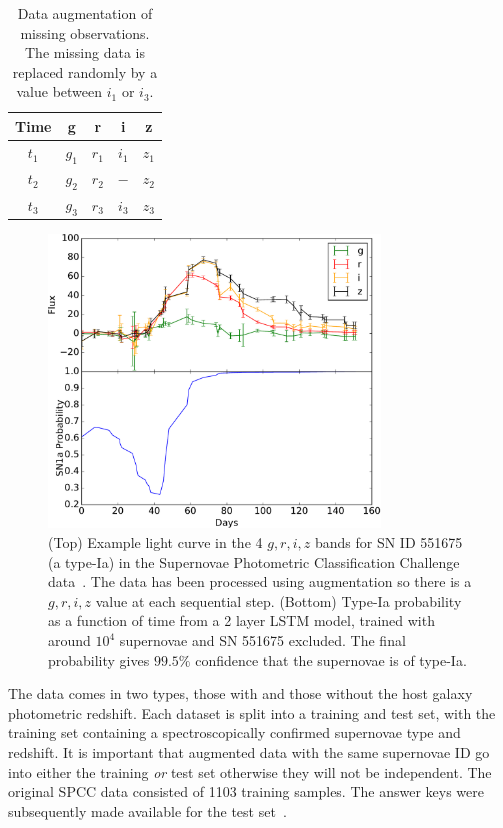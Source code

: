 \documentclass[twocolumn]{aastex61}
\begin{document}
\begin{table}[htdp]
\begin{center}
\begin{tabular}{|c|c|c|c|c|}\hline  
 Time&g&r&i&z\\\hline\hline 
$t_1$&$g_1$&$r_1$&$i_1$&$z_1$\\\hline 
$t_2$&$g_2$&$r_2$&$-$&$z_2$\\\hline 
$t_3$&$g_3$&$r_3$&$i_3$& $z_3$\\\hline 
 \end{tabular}
\end{center}
\label{tab:augment}
\caption{Data augmentation of missing observations. The missing data is replaced randomly by a value between $i_1$ or $i_3$.}
\end{table}%

\begin{figure}
\centering
\includegraphics[width=88mm, angle=0]{f2.pdf}
\caption{\label{fig:lightcurve} (Top) Example light curve in the 4 $g,r,i,z$ bands for SN ID 551675 (a type-Ia) in the Supernovae Photometric Classification Challenge data~\cite{Kessler:2010wk}. The data has been processed using augmentation so there is a $g,r,i,z$ value at each sequential step. (Bottom) Type-Ia probability as a function of time from a 2 layer LSTM model, trained with around $10^4$ supernovae and SN 551675 excluded. The final probability gives $99.5\%$ confidence that the supernovae is of type-Ia. 
 }
\end{figure}


The data comes in two types, those with and those without the host galaxy photometric redshift. Each dataset is split into a training and test set, with the training set containing a spectroscopically confirmed supernovae type and redshift. It is important that augmented data with the same supernovae ID go into either the training {\em or} test set otherwise they will not be independent. The original SPCC data consisted of 1103 training samples. The answer keys were subsequently made available for the test set~\cite{Kessler:2010qj}. 
\end{document}
